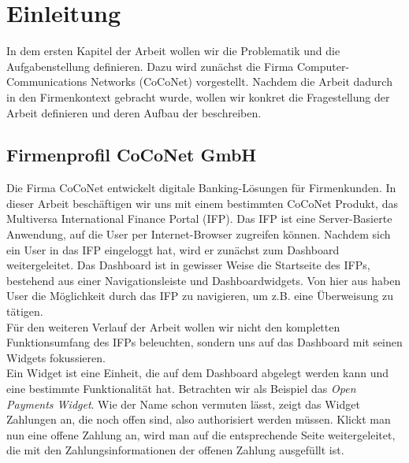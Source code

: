 \section{Einleitung}\raggedbottom
\label{sec:Einleutung}
In dem ersten Kapitel der Arbeit wollen wir die Problematik und die Aufgabenstellung definieren. Dazu wird zunächst die Firma Computer-Communications Networks (CoCoNet) vorgestellt. Nachdem die Arbeit dadurch in den Firmenkontext gebracht wurde, wollen wir konkret die Fragestellung der Arbeit definieren und deren Aufbau der beschreiben.
\subsection{Firmenprofil CoCoNet GmbH}
\label{sub:Firmenprofil CoCoNet GmbH}
Die Firma CoCoNet entwickelt digitale Banking-Lösungen für Firmenkunden. In dieser Arbeit beschäftigen wir uns mit einem bestimmten CoCoNet Produkt, das Multiversa International Finance Portal (IFP). Das IFP ist eine Server-Basierte Anwendung, auf die User per Internet-Browser zugreifen können. Nachdem sich ein User in das IFP eingeloggt hat, wird er zunächst zum Dashboard weitergeleitet. Das Dashboard ist in gewisser Weise die Startseite des IFPs, bestehend aus einer Navigationsleiste und Dashboardwidgets. Von hier aus haben User die Möglichkeit durch das IFP zu navigieren, um z.B. eine Überweisung zu tätigen. \citep{CoCo20} \\
Für den weiteren Verlauf der Arbeit wollen wir nicht den kompletten Funktionsumfang des IFPs beleuchten, sondern uns auf das Dashboard mit seinen Widgets fokussieren.\\
Ein Widget ist eine Einheit, die auf dem Dashboard abgelegt werden kann und eine bestimmte Funktionalität hat. Betrachten wir als Beispiel das \textit{Open Payments Widget}. Wie der Name schon vermuten lässt, zeigt das Widget Zahlungen an, die noch offen sind, also authorisiert werden müssen. Klickt man nun eine offene Zahlung an, wird man auf die entsprechende Seite weitergeleitet, die mit den Zahlungsinformationen der offenen Zahlung ausgefüllt ist.

